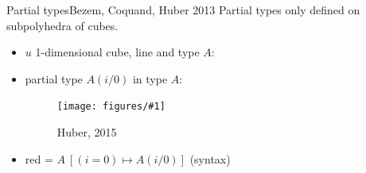 \documentclass[english]{beamer}
\newcommand{\fig}[2]{
    \begin{figure}\begin{center}\texttt{[image: figures/\#1]}\caption{#2\label{#1}}\end{center}
    \end{figure}}
\begin{document}
\begin{frame}{Partial types}{Bezem, Coquand, Huber 2013}
 Partial types only defined on subpolyhedra of cubes.
 
\begin{itemize}
    \item $u$ 1-dimensional cube, line and type $A$:
    \item partial type $A(i/0)$ in type $A$:
            \fig{types_side}{Huber, 2015}
    \item red = $A\ [(i = 0) \mapsto A(i/0)]$ (syntax)
\end{itemize}

 
 
\end{frame}

  

  


  
 
\end{document}
